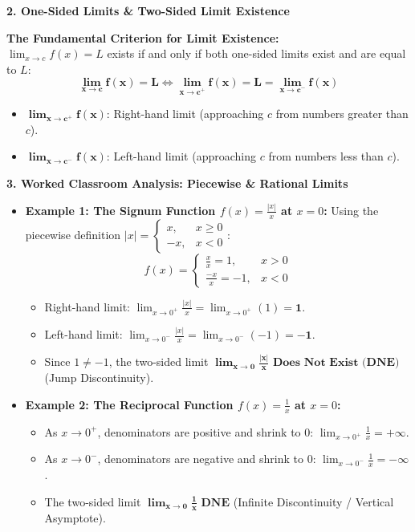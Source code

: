 \documentclass[10.5pt]{article}
\begin{document}
\textbf{\large 2. One-Sided Limits \& Two-Sided Limit Existence}

\begin{tcolorbox}[colback=chalkblue!6, colframe=chalkblue, boxrule=1pt, arc=3pt, left=8pt, right=8pt, top=4pt, bottom=4pt]
\textbf{The Fundamental Criterion for Limit Existence:}\\[2pt]
$\lim_{x\to c} f(x) = L$ exists if and only if both one-sided limits exist and are equal to $L$:
\[
  \mathbf{\lim_{x\to c} f(x) = L \iff \lim_{x\to c^+} f(x) = L = \lim_{x\to c^-} f(x)}
\]
\begin{itemize}[leftmargin=1.2em, topsep=1pt, itemsep=2pt]
  \item $\mathbf{\lim_{x\to c^+} f(x)}$: Right-hand limit (approaching $c$ from numbers greater than $c$).
  \item $\mathbf{\lim_{x\to c^-} f(x)}$: Left-hand limit (approaching $c$ from numbers less than $c$).
\end{itemize}
\end{tcolorbox}

\vspace{0.04in}

\textbf{\large 3. Worked Classroom Analysis: Piecewise \& Rational Limits}

\begin{itemize}[leftmargin=1.2em, topsep=1pt, itemsep=4pt]
  \item \textbf{Example 1: The Signum Function $f(x) = \frac{|x|}{x}$ at $x = 0$:}
  Using the piecewise definition $|x| = \begin{cases} x, & x \ge 0 \\ -x, & x < 0 \end{cases}$:
  \[
    f(x) = \begin{cases} \frac{x}{x} = 1, & x > 0 \\ \frac{-x}{x} = -1, & x < 0 \end{cases}
  \]
  \begin{itemize}[label=--]
    \item Right-hand limit: $\lim_{x\to 0^+} \frac{|x|}{x} = \lim_{x\to 0^+} (1) = \mathbf{1}$.
    \item Left-hand limit: $\lim_{x\to 0^-} \frac{|x|}{x} = \lim_{x\to 0^-} (-1) = \mathbf{-1}$.
    \item Since $1 \ne -1$, the two-sided limit $\mathbf{\lim_{x\to 0}\frac{|x|}{x} \text{ Does Not Exist (DNE)}}$ (Jump Discontinuity).
  \end{itemize}

  \item \textbf{Example 2: The Reciprocal Function $f(x) = \frac{1}{x}$ at $x = 0$:}
  \begin{itemize}[label=--]
    \item As $x \to 0^+$, denominators are positive and shrink to 0: $\lim_{x\to 0^+} \frac{1}{x} = \mathbf{+\infty}$.
    \item As $x \to 0^-$, denominators are negative and shrink to 0: $\lim_{x\to 0^-} \frac{1}{x} = \mathbf{-\infty}$.
    \item The two-sided limit $\mathbf{\lim_{x\to 0}\frac{1}{x} \text{ DNE}}$ (Infinite Discontinuity / Vertical Asymptote).
  \end{itemize}
\end{itemize}
\end{document}
